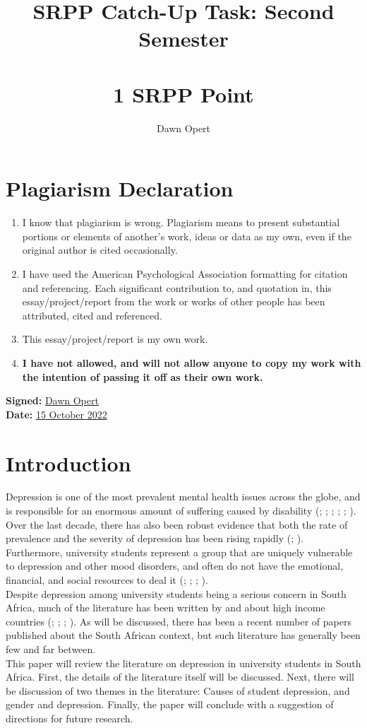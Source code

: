 \documentclass[stu,a4paper,12pt,donotrepeattitle]{apa7}
\title{SRPP Catch-Up Task: Second Semester\\~\\
1 SRPP Point}
\author{Dawn Opert}
\affiliation{OPRNET001}
\begin{document}
\maketitle
\section{Plagiarism Declaration}
\begin{enumerate}
    \item I know that plagiarism is wrong. Plagiarism means to present
        substantial portions or elements of another’s work, ideas or data
        as my own, even if the original author is cited occasionally.
    \item I have used the American Psychological Association formatting for
        citation and referencing. Each significant contribution to, and
        quotation in, this essay/project/report from the work or works of other
        people has been attributed, cited and referenced.
    \item This essay/project/report is my own work.
    \item \textbf{I have not allowed, and will not allow anyone to copy my work
        with the intention of passing it off as their own work.}
\end{enumerate}

\textbf{Signed:} \underline{Dawn Opert}\\
\textbf{Date:} \underline{15 October 2022}
\newpage
\section{Introduction}
Depression is one of the most prevalent mental health issues across the globe,
and is responsible for an enormous amount of suffering caused by disability
(\cite{makh21b}; \cite{makh21}; \cite{makhdeb16}; \cite{malletal18};
\cite{mason19}; \cite{roussetal21}). Over the last decade, there has also been
robust evidence that both the rate of prevalence and the severity of depression
has been rising rapidly (\cite{makh21}; \cite{roussetal21}). Furthermore,
university students represent a group that are uniquely vulnerable to
depression and other mood disorders, and often do not have the emotional,
financial, and social resources to deal it (\cite{makh21}; \cite{malletal18};
\cite{mason19}; \cite{roussetal21}).\\
Despite depression among university students being a serious concern in South
Africa, much of the literature has been written by and about high income
countries (\cite{makh21b}; \cite{makh21}; \cite{makhdeb16}; \cite{roussetal21}).
As will be discussed, there has been a recent number of papers published about
the South African context, but such literature has generally been few and far
between.\\
This paper will review the literature on depression in university students in
South Africa. First, the details of the literature itself will be discussed. Next,
there will be discussion of two themes in the literature: Causes of student
depression, and gender and depression.
Finally, the paper will conclude with a suggestion of directions for future
research.
\end{document}
